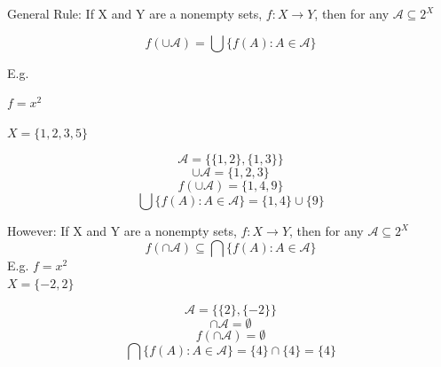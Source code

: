\documentclass[12pt]{article}
\begin{document}
General Rule:
If X and Y are a nonempty sets, $f: X\rightarrow Y$, then for any $\mathcal{A}\subseteq 2^X$

$$f(\cup\mathcal{A})= \bigcup \{f(A): A\in \mathcal{A}\}$$

E.g.

$f=x^2$

$X=\{1, 2, 3, 5\}$

$$\mathcal{A}=\{\{1,2\}, \{1,3\}\}$$
$$\cup\mathcal{A}=\{1,2,3\}$$
$$f(\cup\mathcal{A})=\{1, 4, 9\}$$
$$ \bigcup \{f(A): A\in \mathcal{A}\}= \{1, 4\}\cup\{9\}$$

However:
If X and Y are a nonempty sets, $f: X\rightarrow Y$, then for any $\mathcal{A}\subseteq 2^X$
$$f(\cap\mathcal{A})\subseteq \bigcap \{f(A): A\in \mathcal{A}\}$$
E.g.
$f=x^2$\\
$X=\{-2,2\}$

$$\mathcal{A}=\{\{2\}, \{-2\}\}$$
$$\cap\mathcal{A}=\emptyset$$
$$f(\cap\mathcal{A})=\emptyset$$
$$ \bigcap \{f(A): A\in \mathcal{A}\}= \{4\}\cap\{4\}=\{4\}$$
\end{document}
